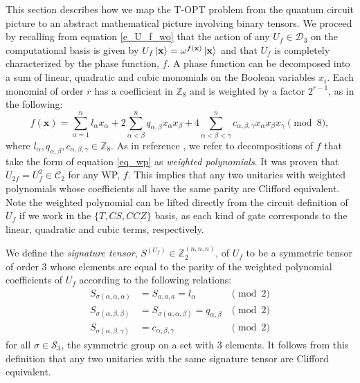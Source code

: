 \documentclass[notitlepage]{article}
\theoremstyle{definition}
\newtheorem{definition}{Definition}[section]
\theoremstyle{problem}
\theoremstyle{lemma}
\begin{document}
This section describes how we map the T-OPT problem from the quantum circuit picture to an abstract mathematical picture involving binary tensors. We proceed by recalling from equation \ref{e_U_f_wo} that the action of any $U_f\in \mathcal{D}_3$ on the computational basis is given by $U_f \left\vert{\mathbf{x}}\right\rangle = \omega^{f(\mathbf{x})}\left\vert{\mathbf{x}}\right\rangle$ and that $U_f$ is completely characterized by the phase function, $f$. A phase function can be decomposed into a sum of linear, quadratic and cubic monomials on the Boolean variables $x_i$. Each monomial of order $r$ has a coefficient in $\mathbb{Z}_8$ and is weighted by a factor $2^{r-1}$, as in the following:
\begin{equation}
\label{eq_wp}
f(\mathbf{x}) = \sum_{\alpha=1}^{n}l_{\alpha}x_\alpha + 2\sum_{\alpha<\beta}^{n} q_{\alpha,\beta}x_\alpha x_\beta + 4\sum_{\alpha<\beta<\gamma}^{n}c_{\alpha,\beta,\gamma}x_\alpha x_\beta x_\gamma \pmod{8},
\end{equation}
where $l_{\alpha},q_{\alpha,\beta},c_{\alpha,\beta,\gamma} \in \mathbb{Z}_8$.
As in reference \cite{4_Campbell_2017}, we refer to decompositions of $f$ that take the form of equation \ref{eq_wp} as \emph{weighted polynomials}.
It was proven that $U_{2f}=U_f^2 \in \mathcal{C}_2$ for any WP, $f$. 
This implies that any two unitaries with weighted polynomials whose coefficients all have the same parity are Clifford equivalent. Note the weighted polynomial can be lifted directly from the circuit definition of $U_f$ if we work in the $\{T, CS, CCZ\}$ basis, as each kind of gate corresponds to the linear, quadratic and cubic terms, respectively.

We define the \emph{signature tensor}, $S^{(U_f)} \in \mathbb{Z}_2^{(n,n,n)}$, of $U_f$ to be a symmetric tensor of order 3 whose elements are equal to the parity of the weighted polynomial coefficients of $U_f$ according to the following relations:
\begin{subequations}
	\label{eq_def_sig}
	\begin{align} 
	S_{\sigma(\alpha,\alpha,\alpha)}& = S_{a,a,a} = l_{\alpha} &\pmod{2} \label{e_def_sig_1}\\
	S_{\sigma(\alpha,\beta,\beta)}& = S_{\sigma(\alpha,\alpha,\beta)} = q_{\alpha,\beta} &\pmod{2} \label{e_def_sig_2}\\
	S_{\sigma(\alpha,\beta,\gamma)}& = c_{\alpha,\beta,\gamma} &\pmod{2} \label{e_def_sig_3}
	\end{align}
\end{subequations}
for all $\sigma \in \mathcal{S}_3$, the symmetric group on a set with 3 elements. It follows from this definition that any two unitaries with the same signature tensor are Clifford equivalent.
\end{document}
